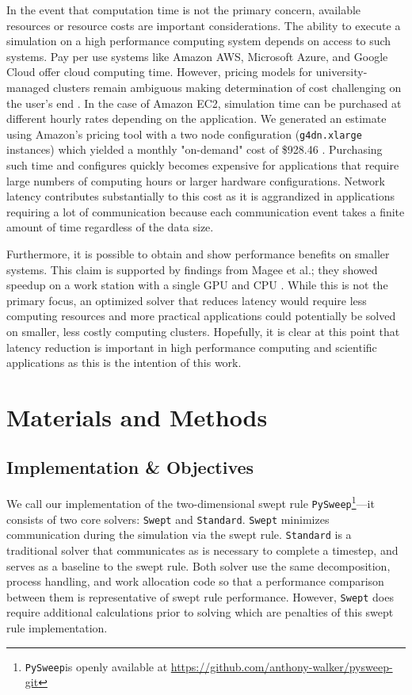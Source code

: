 \documentclass[preprints,article,accept,moreauthors,pdftex]{Definitions/mdpi}
\def\github{\url{https://github.com/anthony-walker/pysweep-git}}
\def\pysweep{\texttt{PySweep}}
\def\Swept{\texttt{Swept}}
\def\Standard{\texttt{Standard}}
\begin{document}
\par
In the event that computation time is not the primary concern, available resources or resource costs are important considerations. The ability to execute a simulation on a high performance computing system depends on access to such systems. Pay per use systems like Amazon AWS, Microsoft Azure, and Google Cloud offer cloud computing time. However, pricing models for university-managed clusters remain ambiguous making determination of cost challenging on the user's end \cite{Mesnard2019}. In the case of Amazon EC2, simulation time can be purchased at different hourly rates depending on the application. We generated an estimate using Amazon's pricing tool with a two node configuration (\texttt{g4dn.xlarge} instances) which yielded a monthly "on-demand" cost of \$928.46 \cite{AmazonServices}. Purchasing such time and configures quickly becomes expensive for applications that require large numbers of computing hours or larger hardware configurations. Network latency contributes substantially to this cost as it is aggrandized in applications requiring a lot of communication because each communication event takes a finite amount of time regardless of the data size. 

Furthermore, it is possible to obtain and show performance benefits on smaller systems. This claim is supported by findings from Magee et al.; they showed speedup on a work station with a single GPU and CPU \cite{Magee2018AcceleratingDecomposition}. While this is not the primary focus, an optimized solver that reduces latency would require less computing resources and more practical applications could potentially be solved on smaller, less costly computing clusters. Hopefully, it is clear at this point that latency reduction is important in high performance computing and scientific applications as this is the intention of this work.


\section{Materials and Methods}
\label{methods-section}
\subsection{Implementation \& Objectives}
We call our implementation of the two-dimensional swept rule \pysweep{}\footnote{\pysweep is openly available at \github}---it consists of two core solvers: \Swept{} and \Standard{}. \Swept{} minimizes communication during the simulation via the swept rule. \Standard{} is a traditional solver that communicates as is necessary to complete a timestep, and serves as a baseline to the swept rule. Both solver use the same decomposition, process handling, and work allocation code so that a performance comparison between them is representative of swept rule performance. However, \Swept{} does require additional calculations prior to solving which are penalties of this swept rule implementation. 
\end{document}
